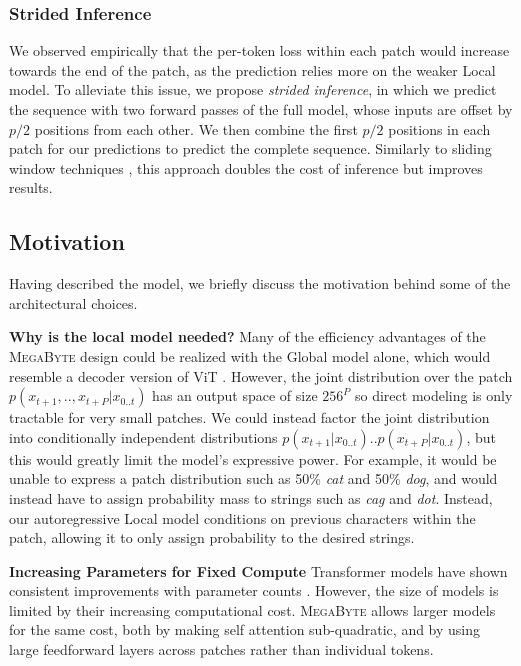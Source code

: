 \subsubsection{Strided Inference}
\label{strided}
We observed empirically that the per-token loss within each patch would increase towards the end of the patch, as the prediction relies more on the weaker Local model. To alleviate this issue, we propose \emph{strided inference}, in which we predict the sequence with two forward passes of the full model, whose inputs are offset by $p/2$ positions from each other. We then combine the first $p/2$ positions in each patch for our predictions to predict the complete sequence. Similarly to sliding window techniques \citep{shortformer}, this approach doubles the cost of inference but improves results.

\subsection{Motivation}
Having described the model, we briefly discuss the motivation behind some of the architectural choices.

\textbf{Why is the local model needed?} Many of the efficiency advantages of the \textsc{MegaByte} design could be realized with the Global model alone, which would resemble a decoder version of ViT \citep{vit}. However,  the joint distribution over the patch $p(x_{t+1},..,x_{t+P}|x_{0..t})$ has an output space of size $256^{P}$ so direct modeling is only tractable for very small patches. We could instead factor the joint distribution into conditionally independent distributions $p(x_{t+1}|x_{0..t})..p(x_{t+P}|x_{0..t})$, but this would greatly limit the model's expressive power. For example, it would be unable to express a patch distribution such as 50\% \emph{cat} and 50\% \emph{dog}, and would instead have to assign probability mass to strings such as \emph{cag} and \emph{dot}. Instead, our autoregressive Local model conditions on previous characters within the patch, allowing it to only assign probability to the desired strings.

\textbf{Increasing Parameters for Fixed Compute}  Transformer models have shown consistent improvements with parameter counts \citep{kaplan2020scaling}. However, the size of models is limited by their increasing computational cost. \textsc{MegaByte} allows larger models for the same cost, both by making self attention sub-quadratic, and by using large feedforward layers across patches rather than individual tokens.

